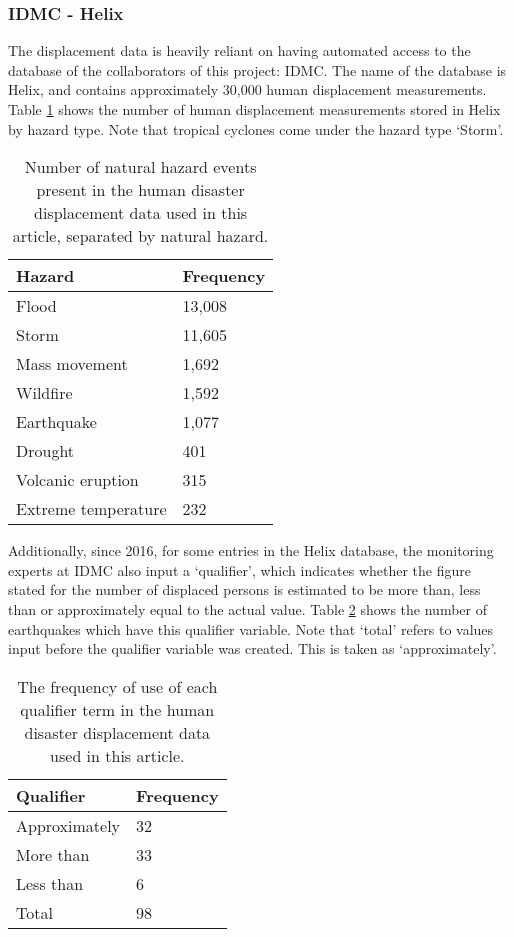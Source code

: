 \documentclass[10pt,a4paper]{article}
\begin{document}
\begin{multicols}{1}
\subsubsection{IDMC - Helix}\label{sec:helix}
The displacement data is heavily reliant on having automated access to the database of the collaborators of this project: IDMC. The name of the database is Helix, and contains approximately 30,000 human displacement measurements. Table \ref{tab:IDMCdis} shows the number of human displacement measurements stored in Helix by hazard type. Note that tropical cyclones come under the hazard type `Storm'.
\begin{table}[H]
  \begin{centering}
  \caption{Number of natural hazard events present in the human disaster displacement data used in this article, separated by natural hazard.}
  \label{tab:IDMCdis}
  \begin{tabular}{|l|l|}
    \hline
    Hazard & Frequency  \\
    \hline    
    Flood &               13,008 \\
    Storm &              11,605 \\
    Mass movement &        1,692\\
    Wildfire &             1,592\\
    Earthquake &           1,077\\
    Drought &               401\\
    Volcanic eruption &     315\\
    Extreme temperature &   232\\
    \hline
  \end{tabular}
  \end{centering}
\end{table}
Additionally, since 2016, for some entries in the Helix database, the monitoring experts at IDMC also input a `qualifier', which indicates whether the figure stated for the number of displaced persons is estimated to be more than, less than or approximately equal to the actual value. Table \ref{tab:qualifier} shows the number of earthquakes which have this qualifier variable. Note that `total' refers to values input before the qualifier variable was created. This is taken as `approximately'.
\begin{table}[H] 
  \caption{The frequency of use of each qualifier term in the human disaster displacement data used in this article.}
  \label{tab:qualifier}
  \begin{tabular}{|l|l|}
    \hline
    Qualifier & Frequency  \\
    \hline    
    Approximately & 32 \\
    More than & 33 \\
    Less than & 6 \\
    Total & 98 \\
    \hline    
  \end{tabular}
\end{table}

\end{multicols}
\end{document}
